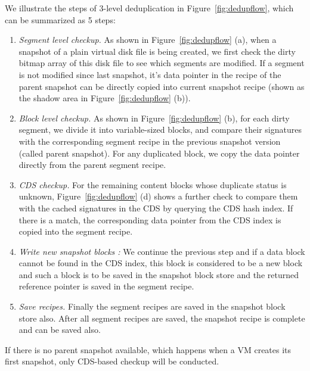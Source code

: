 We illustrate the steps of 3-level deduplication in Figure~\ref{fig:dedupflow}, which can be summarized as 5 steps:
\begin{enumerate}
\item {\em Segment level checkup.}
As shown in Figure~\ref{fig:dedupflow} (a),
when  a snapshot of a plain virtual disk file is being created, we first check the dirty bitmap array of
this disk file  to see which segments are modified. If a segment is not modified since last snapshot, 
it's data pointer in the recipe of the  parent snapshot  can be directly copied into 
current snapshot recipe (shown as the shadow area in Figure~\ref{fig:dedupflow} (b)).

\item {\em Block level checkup.}
As shown in Figure~\ref{fig:dedupflow} (b),
for each dirty segment, we divide it into variable-sized blocks,
and compare their signatures with  the corresponding segment recipe in the previous snapshot version (called parent
snapshot). 
For any duplicated block, we copy the data pointer directly from the parent segment recipe. 
\item {\em CDS checkup.} For the remaining  content blocks whose duplicate status is unknown,
Figure~\ref{fig:dedupflow} (d)
shows  a further check to compare  them with  the cached signatures in the CDS by querying
the CDS hash index. If there is a match, the corresponding data pointer from the CDS index is
copied into the segment recipe. 
\item {\em Write new snapshot blocks :}
We continue the previous step and 
if a data block cannot be found in the CDS index, this block is considered to be a new block
and such a block is to be saved in the snapshot block store and  the returned reference  pointer is
saved in the  segment recipe.
\item {\em Save recipes.} Finally the  segment recipes are saved in the  snapshot block store also.
 After all segment recipes are saved, the snapshot recipe is complete and can be saved also.
\end{enumerate}

If there is no parent snapshot available, which happens when a VM creates its first snapshot, 
only CDS-based checkup will be conducted.
